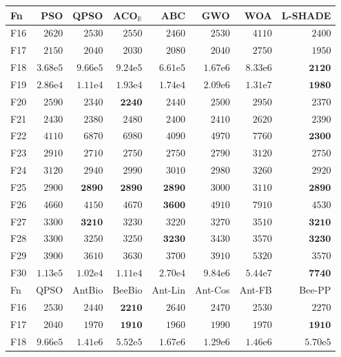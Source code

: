 \begin{tabular}{lrrrrrrr}
\toprule
Fn & PSO & QPSO & ACO$_\mathbb{R}$ & ABC & GWO & WOA & L-SHADE \\
\midrule
F16 & $2620$ & $2530$ & $2550$ & $2460$ & $2530$ & $4110$ & $2400$ \\
F17 & $2150$ & $2040$ & $2030$ & $2080$ & $2040$ & $2750$ & $1950$ \\
F18 & $3.68\mathrm{e}{5}$ & $9.66\mathrm{e}{5}$ & $9.24\mathrm{e}{5}$ & $6.61\mathrm{e}{5}$ & $1.67\mathrm{e}{6}$ & $8.33\mathrm{e}{6}$ & $\mathbf{2120}$ \\
F19 & $2.86\mathrm{e}{4}$ & $1.11\mathrm{e}{4}$ & $1.93\mathrm{e}{4}$ & $1.74\mathrm{e}{4}$ & $2.09\mathrm{e}{6}$ & $1.31\mathrm{e}{7}$ & $\mathbf{1980}$ \\
F20 & $2590$ & $2340$ & $\mathbf{2240}$ & $2440$ & $2500$ & $2950$ & $2370$ \\
F21 & $2430$ & $2380$ & $2480$ & $2400$ & $2410$ & $2620$ & $2390$ \\
F22 & $4110$ & $6870$ & $6980$ & $4090$ & $4970$ & $7760$ & $\mathbf{2300}$ \\
F23 & $2910$ & $2710$ & $2750$ & $2750$ & $2790$ & $3120$ & $2750$ \\
F24 & $3120$ & $2940$ & $2990$ & $3010$ & $2980$ & $3260$ & $2920$ \\
F25 & $2900$ & $\mathbf{2890}$ & $\mathbf{2890}$ & $\mathbf{2890}$ & $3000$ & $3110$ & $\mathbf{2890}$ \\
F26 & $4660$ & $4150$ & $4670$ & $\mathbf{3600}$ & $4910$ & $7910$ & $4530$ \\
F27 & $3300$ & $\mathbf{3210}$ & $3230$ & $3220$ & $3270$ & $3510$ & $\mathbf{3210}$ \\
F28 & $3300$ & $3250$ & $3250$ & $\mathbf{3230}$ & $3430$ & $3570$ & $\mathbf{3230}$ \\
F29 & $3900$ & $3610$ & $3630$ & $3700$ & $3910$ & $5320$ & $3570$ \\
F30 & $1.13\mathrm{e}{5}$ & $1.02\mathrm{e}{4}$ & $1.11\mathrm{e}{4}$ & $2.70\mathrm{e}{4}$ & $9.84\mathrm{e}{6}$ & $5.44\mathrm{e}{7}$ & $\mathbf{7740}$ \\
\midrule
Fn & QPSO & AntBio & BeeBio & Ant-Lin & Ant-Cos & Ant-FB & Bee-PP \\
\midrule
F16 & $2530$ & $2440$ & $\mathbf{2210}$ & $2640$ & $2470$ & $2530$ & $2270$ \\
F17 & $2040$ & $1970$ & $\mathbf{1910}$ & $1960$ & $1990$ & $1970$ & $\mathbf{1910}$ \\
F18 & $9.66\mathrm{e}{5}$ & $1.41\mathrm{e}{6}$ & $5.52\mathrm{e}{5}$ & $1.67\mathrm{e}{6}$ & $1.29\mathrm{e}{6}$ & $1.46\mathrm{e}{6}$ & $5.70\mathrm{e}{5}$ \\

\end{tabular}
